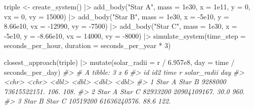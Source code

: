 \documentclass[
  10.5pt,
  letterpaper,
]{scrbook}
\newenvironment{Shaded}{\begin{snugshade}}{\end{snugshade}}
\newcommand{\AttributeTok}[1]{\textcolor[rgb]{0.00,0.00,0.00}{#1}}
\newcommand{\CommentTok}[1]{\textcolor[rgb]{0.00,0.00,0.00}{\textit{#1}}}
\newcommand{\DecValTok}[1]{\textcolor[rgb]{0.00,0.00,0.00}{#1}}
\newcommand{\FloatTok}[1]{\textcolor[rgb]{0.00,0.00,0.00}{#1}}
\newcommand{\FunctionTok}[1]{\textcolor[rgb]{0.00,0.00,0.00}{#1}}
\newcommand{\NormalTok}[1]{\textcolor[rgb]{0.00,0.00,0.00}{#1}}
\newcommand{\OtherTok}[1]{\textcolor[rgb]{0.00,0.00,0.00}{#1}}
\newcommand{\SpecialCharTok}[1]{\textcolor[rgb]{0.00,0.00,0.00}{#1}}
\newcommand{\StringTok}[1]{\textcolor[rgb]{0.00,0.00,0.00}{#1}}
\theoremstyle{plain}
\theoremstyle{remark}
\begin{document}
\begin{Shaded}
\begin{Highlighting}[]
\NormalTok{triple }\OtherTok{\textless{}{-}} \FunctionTok{create\_system}\NormalTok{() }\SpecialCharTok{|\textgreater{}}
  \FunctionTok{add\_body}\NormalTok{(}\StringTok{"Star A"}\NormalTok{, }\AttributeTok{mass =} \FloatTok{1e30}\NormalTok{, }\AttributeTok{x =} \FloatTok{1e11}\NormalTok{,  }\AttributeTok{y =} \DecValTok{0}\NormalTok{,        }\AttributeTok{vx =} \DecValTok{0}\NormalTok{,      }\AttributeTok{vy =} \DecValTok{15000}\NormalTok{) }\SpecialCharTok{|\textgreater{}}
  \FunctionTok{add\_body}\NormalTok{(}\StringTok{"Star B"}\NormalTok{, }\AttributeTok{mass =} \FloatTok{1e30}\NormalTok{, }\AttributeTok{x =} \SpecialCharTok{{-}}\FloatTok{5e10}\NormalTok{, }\AttributeTok{y =} \FloatTok{8.66e10}\NormalTok{,  }\AttributeTok{vx =} \SpecialCharTok{{-}}\DecValTok{12990}\NormalTok{, }\AttributeTok{vy =} \SpecialCharTok{{-}}\DecValTok{7500}\NormalTok{) }\SpecialCharTok{|\textgreater{}}
  \FunctionTok{add\_body}\NormalTok{(}\StringTok{"Star C"}\NormalTok{, }\AttributeTok{mass =} \FloatTok{1e30}\NormalTok{, }\AttributeTok{x =} \SpecialCharTok{{-}}\FloatTok{5e10}\NormalTok{, }\AttributeTok{y =} \SpecialCharTok{{-}}\FloatTok{8.66e10}\NormalTok{, }\AttributeTok{vx =} \DecValTok{14000}\NormalTok{,  }\AttributeTok{vy =} \SpecialCharTok{{-}}\DecValTok{8000}\NormalTok{) }\SpecialCharTok{|\textgreater{}}
  \FunctionTok{simulate\_system}\NormalTok{(}\AttributeTok{time\_step =}\NormalTok{ seconds\_per\_hour, }\AttributeTok{duration =}\NormalTok{ seconds\_per\_year }\SpecialCharTok{*} \DecValTok{3}\NormalTok{)}

\FunctionTok{closest\_approach}\NormalTok{(triple) }\SpecialCharTok{|\textgreater{}}
  \FunctionTok{mutate}\NormalTok{(}\AttributeTok{solar\_radii =}\NormalTok{ r }\SpecialCharTok{/} \FloatTok{6.957e8}\NormalTok{, }\AttributeTok{day =}\NormalTok{ time }\SpecialCharTok{/}\NormalTok{ seconds\_per\_day)}
\CommentTok{\#\textgreater{} \# A tibble: 3 x 6}
\CommentTok{\#\textgreater{}   id     id2        time            r solar\_radii   day}
\CommentTok{\#\textgreater{}   \textless{}chr\textgreater{}  \textless{}chr\textgreater{}     \textless{}dbl\textgreater{}        \textless{}dbl\textgreater{}       \textless{}dbl\textgreater{} \textless{}dbl\textgreater{}}
\CommentTok{\#\textgreater{} 1 Star A Star B  9288000 73615522151.       106.   108.}
\CommentTok{\#\textgreater{} 2 Star A Star C 82933200 20904109167.        30.0  960.}
\CommentTok{\#\textgreater{} 3 Star B Star C 10519200 61636240576.        88.6  122.}
\end{Highlighting}
\end{Shaded}
\end{document}

